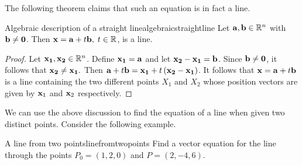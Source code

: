 The following theorem claims that such an equation is in fact a line. 

\begin{proposition}{Algebraic description of a straight line}{algebraicstraightline}
Let ${\bf a},{\bf b}\in \mathbb{R}^{n}$ with ${\bf b}\neq {\bf 0}$. 
Then ${\bf x}={\bf a}+t{\bf b},\; t\in \mathbb{R}$, is a
line.
\end{proposition}

\begin{proof}
Let ${\bf x_{1}}, {\bf x_{2}} \in \mathbb{R}^n$. 
Define ${\bf x_{1}}={\bf a}$ and let ${\bf x_{2}}-{\bf x_{1}}={\bf b}$.
Since ${\bf b} \neq {\bf 0}$, it follows that ${\bf x_{2}}\neq {\bf x_{1}}.$ Then
${\bf a}+t{\bf b}={\bf x_{1}} + t\left( {\bf x_{2}}-{\bf x_{1}}\right) $. It follows that  
${\bf x}={\bf a}+t{\bf b}$ is a line containing the two different points 
$X_1$ and $X_2$ whose position vectors are given by ${\bf x}_1$ and ${\bf x}_2$ respectively. 
\end{proof}

We can use the above discussion to find the equation of a line when given two distinct points.
Consider the following example. 

\begin{example}{A line from two points}{linefromtwopoints}
Find a vector equation for the line through the points $P_0 = \left(
1,2,0\right) $ and $P = \left( 2,-4,6\right).$
\end{example}

